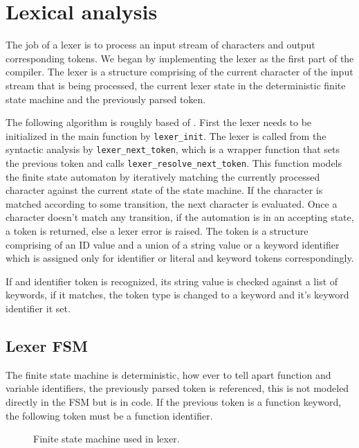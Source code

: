 \documentclass[11pt]{article}
\begin{document}
\section{Lexical analysis}
The job of a lexer is to process an input stream of characters and output corresponding tokens. We began by implementing the lexer as the first part of the compiler. The lexer is a structure comprising of the current character of the input stream that is being processed, the current lexer state in the deterministic finite state machine and the previously parsed token.

The following algorithm is roughly based of \cite[p.~62]{10.5555/77624}. First the lexer needs to be initialized in the main function by \texttt{lexer\_init}. The lexer is called from the syntactic analysis by \texttt{lexer\_next\_token}, which is a wrapper function that sets the previous token and calls \texttt{lexer\_resolve\_next\_token}. This function models the finite state automaton by iteratively matching the currently processed character against the current state of the state machine. If the character is matched according to some transition, the next character is evaluated. Once a character doesn't match any transition, if the automation is in an accepting state, a token is returned, else a lexer error is raised. The token is a structure comprising of an ID value and a union of a string value or a keyword identifier which is assigned only for identifier or literal and keyword tokens correspondingly. 

If and identifier token is recognized, its string value is checked against a list of keywords, if it matches, the token type is changed to a keyword and it's keyword identifier it set.
\subsection{Lexer FSM}
The finite state machine is deterministic, how ever to tell apart function and variable identifiers, the previously parsed token is referenced, this is not modeled directly in the FSM but is in code. If the previous token is a function keyword, the following token must be a function identifier.


\begin{landscape}
\null
\vfill

\begin{figure}[h]
	\centering
	
	\caption{Finite state machine used in lexer.}
	\label{fig:fsm}
\end{figure}


\vfill
\end{landscape}
\restoregeometry
\end{document}

